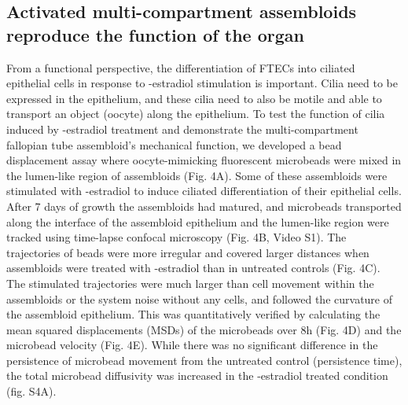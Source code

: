 \begin{refsection}
    
    \subsection{Activated multi-compartment assembloids reproduce the function of the organ}
    From a functional perspective, the differentiation of FTECs into ciliated epithelial cells in response to \textbeta-estradiol stimulation is important. Cilia need to be expressed in the epithelium, and these cilia need to also be motile and able to transport an object (oocyte) along the epithelium\cite{yuan2021a,suarez2021a,wanggren2008a}. To test the function of cilia induced by \textbeta-estradiol treatment and demonstrate the multi-compartment fallopian tube assembloid’s mechanical function, we developed a bead displacement assay where oocyte-mimicking fluorescent microbeads were mixed in the lumen-like region of assembloids (Fig. 4A). Some of these assembloids were stimulated with \textbeta-estradiol to induce ciliated differentiation of their epithelial cells. After 7 days of growth the assembloids had matured, and microbeads transported along the interface of the assembloid epithelium and the lumen-like region were tracked using time-lapse confocal microscopy (Fig. 4B, Video S1). The trajectories of beads were more irregular and covered larger distances when assembloids were treated with \textbeta-estradiol than in untreated controls (Fig. 4C). The stimulated trajectories were much larger than cell movement within the assembloids or the system noise without any cells, and followed the curvature of the assembloid epithelium. This was quantitatively verified by calculating the mean squared displacements (MSDs) of the microbeads over 8h (Fig. 4D) and the microbead velocity (Fig. 4E)\cite{wirtz2009a,wu2015a}. While there was no significant difference in the persistence of microbead movement from the untreated control (persistence time), the total microbead diffusivity was increased in the \textbeta-estradiol treated condition (fig. S4A). 

\end{refsection}

